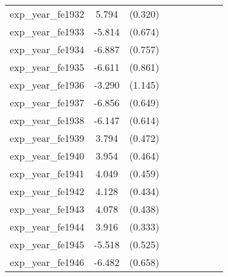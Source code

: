 {\begin{tabular}{l*{4}{cc}}
exp\_year\_fe1932&    5.794\sym{***}&  (0.320)&                  &         &                  &         &                  &         \\
exp\_year\_fe1933&   -5.814\sym{***}&  (0.674)&                  &         &                  &         &                  &         \\
exp\_year\_fe1934&   -6.887\sym{***}&  (0.757)&                  &         &                  &         &                  &         \\
exp\_year\_fe1935&   -6.611\sym{***}&  (0.861)&                  &         &                  &         &                  &         \\
exp\_year\_fe1936&   -3.290\sym{**} &  (1.145)&                  &         &                  &         &                  &         \\
exp\_year\_fe1937&   -6.856\sym{***}&  (0.649)&                  &         &                  &         &                  &         \\
exp\_year\_fe1938&   -6.147\sym{***}&  (0.614)&                  &         &                  &         &                  &         \\
exp\_year\_fe1939&    3.794\sym{***}&  (0.472)&                  &         &                  &         &                  &         \\
exp\_year\_fe1940&    3.954\sym{***}&  (0.464)&                  &         &                  &         &                  &         \\
exp\_year\_fe1941&    4.049\sym{***}&  (0.459)&                  &         &                  &         &                  &         \\
exp\_year\_fe1942&    4.128\sym{***}&  (0.434)&                  &         &                  &         &                  &         \\
exp\_year\_fe1943&    4.078\sym{***}&  (0.438)&                  &         &                  &         &                  &         \\
exp\_year\_fe1944&    3.916\sym{***}&  (0.333)&                  &         &                  &         &                  &         \\
exp\_year\_fe1945&   -5.518\sym{***}&  (0.525)&                  &         &                  &         &                  &         \\
exp\_year\_fe1946&   -6.482\sym{***}&  (0.658)&                  &         &                  &         &                  &         \\

\end{tabular}}

